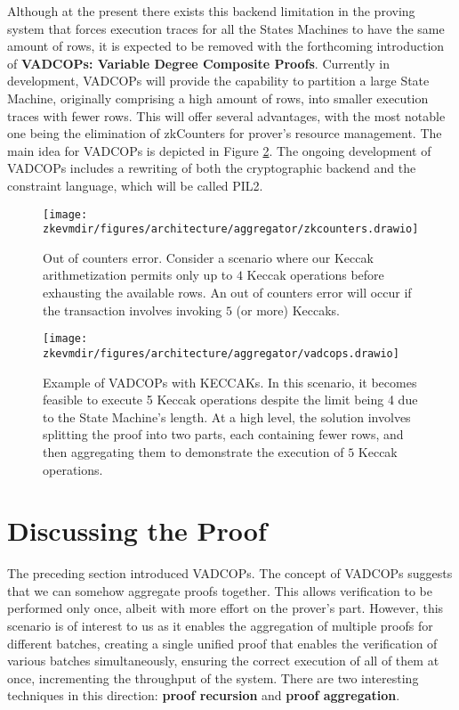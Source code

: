 Although at the present there exists this backend limitation in the proving system that forces execution traces for all the States Machines to have the same amount of rows, it is expected to be removed with the forthcoming introduction of \textbf{VADCOPs: Variable Degree Composite Proofs}. Currently in development, VADCOPs will provide the capability to partition a large State Machine, originally comprising a high amount of rows, into smaller execution traces with fewer rows. This will offer several advantages, with the most notable one being the elimination of zkCounters for prover's resource management. The main idea for VADCOPs is depicted in Figure \ref{fig:vadcops}. The ongoing development of VADCOPs includes a rewriting of both the cryptographic backend and the constraint language, which will be called PIL2.


\begin{figure}[h]
\centering
\texttt{[image: \\zkevmdir/figures/architecture/aggregator/zkcounters.drawio]}
\caption{Out of counters error. Consider a scenario where our Keccak arithmetization permits only up to $4$ Keccak operations before exhausting the available rows. An out of counters error will occur if the transaction involves invoking $5$ (or more) Keccaks.
}
\label{fig:ooc-error}
\end{figure}

\begin{figure}[h]
\centering
\texttt{[image: \\zkevmdir/figures/architecture/aggregator/vadcops.drawio]}
\caption{Example of VADCOPs with KECCAKs. In this scenario, it becomes feasible to execute 5 Keccak operations despite the limit being 4 due to the State Machine's length. At a high level, the solution involves splitting the proof into two parts, each containing fewer rows, and then aggregating them to demonstrate the execution of $5$ Keccak operations.}
\label{fig:vadcops}
\end{figure}






\section{Discussing the Proof}

The preceding section introduced VADCOPs. The concept of VADCOPs suggests that we can somehow aggregate proofs together. This allows verification to be performed only once, albeit with more effort on the prover's part. However, this scenario is of interest to us as it enables the aggregation of multiple proofs for different batches, creating a single unified proof that enables the verification of various batches simultaneously, ensuring the correct execution of all of them at once, incrementing the throughput of the system. There are two interesting techniques in this direction: \textbf{proof recursion} and \textbf{proof aggregation}.

